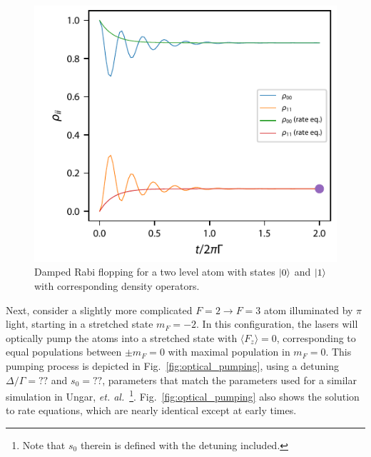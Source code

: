 \documentclass[final,5p,times,twocolumn]{elsarticle}
\begin{document}
\begin{figure}
	\center
	\includegraphics{figs/damped_rabi_flopping.pdf}
	\caption{\label{fig:rabi_flopping} Damped Rabi flopping for a two level atom with states $\ket{0}$ and $\ket{1}$ with corresponding density operators.}
\end{figure}

Next, consider a slightly more complicated $F=2\rightarrow F=3$ atom illuminated by $\pi$ light, starting in a stretched state $m_F=-2$.  In this configuration, the lasers will optically pump the atoms into a stretched state with $\langle F_z \rangle = 0$, corresponding to equal populations between $\pm m_F=0$ with maximal population in $m_F=0$.  This pumping process is depicted in Fig.~\ref{fig:optical_pumping}, using a detuning $\Delta/\Gamma = ??$ and $s_0=??$, parameters that match the parameters used for a similar simulation in Ungar, {\it et. al.}~\cite{Ungar1989}\footnote{Note that $s_0$ therein is defined with the detuning included.}.  Fig.~\ref{fig:optical_pumping} also shows the solution to rate equations, which are nearly identical except at early times.
\end{document}
